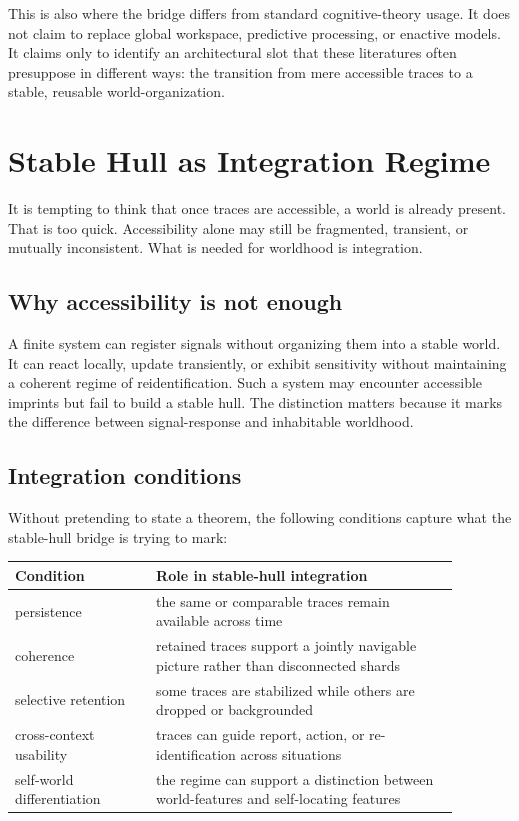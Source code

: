 \documentclass[12pt]{article}
\begin{document}
This is also where the bridge differs from standard cognitive-theory usage. It does not claim to replace global workspace, predictive processing, or enactive models. It claims only to identify an architectural slot that these literatures often presuppose in different ways: the transition from mere accessible traces to a stable, reusable world-organization.

\section{Stable Hull as Integration Regime}

It is tempting to think that once traces are accessible, a world is already present. That is too quick. Accessibility alone may still be fragmented, transient, or mutually inconsistent. What is needed for worldhood is integration.

\subsection{Why accessibility is not enough}

A finite system can register signals without organizing them into a stable world. It can react locally, update transiently, or exhibit sensitivity without maintaining a coherent regime of reidentification. Such a system may encounter accessible imprints but fail to build a stable hull. The distinction matters because it marks the difference between signal-response and inhabitable worldhood.

\subsection{Integration conditions}

Without pretending to state a theorem, the following conditions capture what the stable-hull bridge is trying to mark:

\begin{center}
\begin{tabular}{P{0.28\linewidth}P{0.6\linewidth}}
\toprule
\textbf{Condition} & \textbf{Role in stable-hull integration} \\
\midrule
persistence & the same or comparable traces remain available across time \\
coherence & retained traces support a jointly navigable picture rather than disconnected shards \\
selective retention & some traces are stabilized while others are dropped or backgrounded \\
cross-context usability & traces can guide report, action, or re-identification across situations \\
self-world differentiation & the regime can support a distinction between world-features and self-locating features \\
\bottomrule
\end{tabular}
\end{center}
\end{document}
